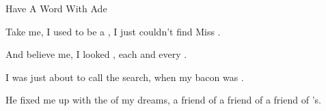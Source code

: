 \begin{SBSong}{Have A Word With Ade}
\begin{SBVerse}
    Take me, I used to be a , I just couldn't find Miss .
    
    And believe me, I looked , each and every .
    
    I was just about to call  the search, when my bacon was .
    
    He fixed me up with the  of my dreams, \WBLineBrk \CBLineBrk a friend of a friend of a friend of 's. 
  \end{SBVerse}
\end{SBSong}

